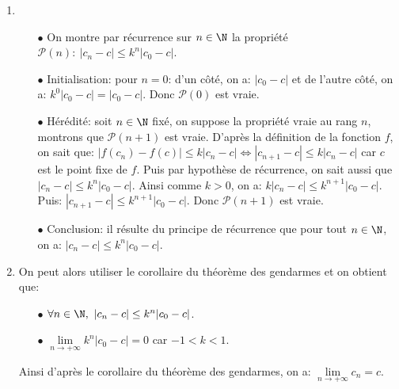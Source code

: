 \documentclass[a4paper, 11pt,reqno]{article}
\begin{document}
\begin{correction}
\begin{enumerate}
\begin{enumerate}
\item
\begin{itemize}
\item[$\bullet$] On montre par r\'ecurrence sur $n\in\N$ la propri\'et\'e $\mathcal{P}(n):\ |c_n-c|\leq k^n |c_0-c|$.
\item[$\bullet$] Initialisation: pour $n=0$: d'un c\^{o}t\'e, on a: $|c_0-c|$ et de l'autre c\^{o}t\'e, on a: $k^0|c_0-c|=|c_0-c|$. Donc $\mathcal{P}(0)$ est vraie.
\item[$\bullet$] H\'er\'edit\'e: soit $n\in\N$ fix\'e, on suppose la propri\'et\'e vraie au rang $n$, montrons que $\mathcal{P}(n+1)$ est vraie. D'apr\`{e}s la d\'efinition de la fonction $f$, on sait que: $|f(c_n)-f(c)|\leq k|c_n-c|\Leftrightarrow |c_{n+1}-c|\leq k|c_n-c|$ car $c$ est le point fixe de $f$. Puis par hypoth\`{e}se de r\'ecurrence, on sait aussi que $|c_n-c|\leq k^n |c_0-c|$. Ainsi comme $k>0$, on a: $k|c_n-c|\leq k^{n+1}|c_0-c|$. Puis: $|c_{n+1}-c|\leq k^{n+1}|c_0-c|$. Donc $\mathcal{P}(n+1)$ est vraie.
\item[$\bullet$] Conclusion: il r\'esulte du principe de r\'ecurrence que pour tout $n\in\N$, on a: $|c_n-c|\leq k^n |c_0-c|$.
\end{itemize}
\item On peut alors utiliser le corollaire du th\'eor\`{e}me des gendarmes et on obtient que:
\begin{itemize}
\item[$\bullet$] $\forall n\in\N,\ |c_n-c|\leq k^n |c_0-c|$.
\item[$\bullet$] $\lim\limits_{n\to +\infty} k^n|c_0-c|=0$ car $-1<k<1$.
\end{itemize}
Ainsi d'apr\`{e}s le corollaire du th\'eor\`{e}me des gendarmes, on a: $\lim\limits_{n\to +\infty} c_n=c$.
\end{enumerate}
\end{enumerate}
\end{correction}





\newpage
\end{document}
